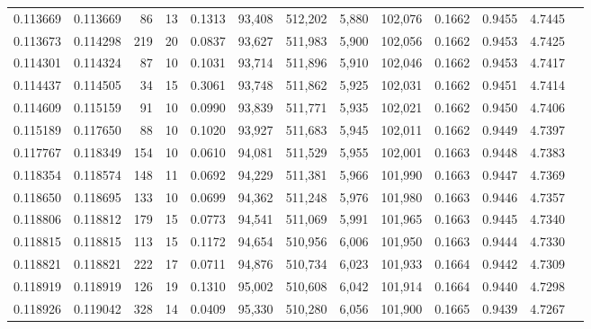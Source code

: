\begin{tabular}{rrrrrrrrrrrrr}
0.113669 & 0.113669 &    86 &  13 &                                     0.1313 &  93,408 & 512,202 &   5,880 & 102,076 & 0.1662 & 0.9455 & 4.7445 \\
0.113673 & 0.114298 &   219 &  20 &                                     0.0837 &  93,627 & 511,983 &   5,900 & 102,056 & 0.1662 & 0.9453 & 4.7425 \\
0.114301 & 0.114324 &    87 &  10 &                                     0.1031 &  93,714 & 511,896 &   5,910 & 102,046 & 0.1662 & 0.9453 & 4.7417 \\
0.114437 & 0.114505 &    34 &  15 &                                     0.3061 &  93,748 & 511,862 &   5,925 & 102,031 & 0.1662 & 0.9451 & 4.7414 \\
0.114609 & 0.115159 &    91 &  10 &                                     0.0990 &  93,839 & 511,771 &   5,935 & 102,021 & 0.1662 & 0.9450 & 4.7406 \\
0.115189 & 0.117650 &    88 &  10 &                                     0.1020 &  93,927 & 511,683 &   5,945 & 102,011 & 0.1662 & 0.9449 & 4.7397 \\
0.117767 & 0.118349 &   154 &  10 &                                     0.0610 &  94,081 & 511,529 &   5,955 & 102,001 & 0.1663 & 0.9448 & 4.7383 \\
0.118354 & 0.118574 &   148 &  11 &                                     0.0692 &  94,229 & 511,381 &   5,966 & 101,990 & 0.1663 & 0.9447 & 4.7369 \\
0.118650 & 0.118695 &   133 &  10 &                                     0.0699 &  94,362 & 511,248 &   5,976 & 101,980 & 0.1663 & 0.9446 & 4.7357 \\
0.118806 & 0.118812 &   179 &  15 &                                     0.0773 &  94,541 & 511,069 &   5,991 & 101,965 & 0.1663 & 0.9445 & 4.7340 \\
0.118815 & 0.118815 &   113 &  15 &                                     0.1172 &  94,654 & 510,956 &   6,006 & 101,950 & 0.1663 & 0.9444 & 4.7330 \\
0.118821 & 0.118821 &   222 &  17 &                                     0.0711 &  94,876 & 510,734 &   6,023 & 101,933 & 0.1664 & 0.9442 & 4.7309 \\
0.118919 & 0.118919 &   126 &  19 &                                     0.1310 &  95,002 & 510,608 &   6,042 & 101,914 & 0.1664 & 0.9440 & 4.7298 \\
0.118926 & 0.119042 &   328 &  14 &                                     0.0409 &  95,330 & 510,280 &   6,056 & 101,900 & 0.1665 & 0.9439 & 4.7267 \\

\end{tabular}

